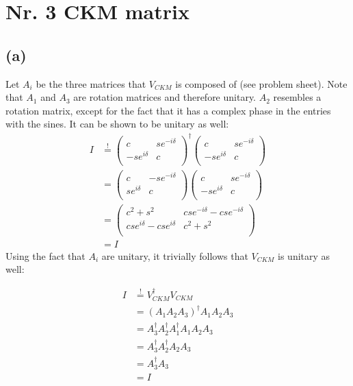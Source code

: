 \documentclass[11pt]{article}
\begin{document}
    \hypertarget{nr.-3-ckm-matrix}{%
\section{Nr. 3 CKM matrix}\label{nr.-3-ckm-matrix}}

\hypertarget{a}{%
\subsection{(a)}\label{a}}

Let \(A_i\) be the three matrices that \(V_{CKM}\) is composed of (see
problem sheet). Note that \(A_1\) and \(A_3\) are rotation matrices and
therefore unitary. \(A_2\) resembles a rotation matrix, except for the
fact that it has a complex phase in the entries with the sines. It can
be shown to be unitary as well: 
\begin{align*}
    I &\overset !=\begin{pmatrix}
        c& s e^{-i\delta}\\
        -s e^{i\delta}& c\\
    \end{pmatrix}^\dagger\begin{pmatrix}
        c& s e^{-i\delta}\\
        -s e^{i\delta}& c\\
    \end{pmatrix}\\
    &=\begin{pmatrix}
        c& -s e^{-i\delta}\\
        s e^{i\delta}& c\\
    \end{pmatrix}\begin{pmatrix}
        c& s e^{-i\delta}\\
        -s e^{i\delta}& c\\
    \end{pmatrix}\\
    &= \begin{pmatrix}
        c^2 +s^2 & c s e^{-i\delta }- c s e^{-i\delta}\\
        c s e^{i\delta }- c s e^{i\delta} & c^2 +s^2\\
    \end{pmatrix}\\
    &= I 
\end{align*}
Using the fact that \(A_i\) are unitary, it trivially follows that
\(V_{CKM}\) is unitary as well:

    \begin{align*}
    I &\overset!= V_{CKM}^\dagger V_{CKM}\\
    &= (A_1A_2A_3)^\dagger A_1 A_2 A_3\\
    &= A_3^\dagger A_2^\dagger A_1^\dagger A_1A_2A_3\\
    &= A_3^\dagger A_2^\dagger A_2A_3\\
    &= A_3^\dagger A_3\\
    &= I\\
    \end{align*}
\end{document}
